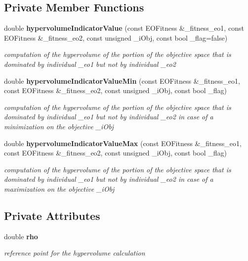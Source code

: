\subsection*{Private Member Functions}
\begin{CompactItemize}
\item 
double {\bf hypervolume\-Indicator\-Value} (const EOFitness \&\_\-fitness\_\-eo1, const EOFitness \&\_\-fitness\_\-eo2, const unsigned \_\-i\-Obj, const bool \_\-flag=false)
\begin{CompactList}\small\item\em computation of the hypervolume of the portion of the objective space that is dominated by individual \_\-eo1 but not by individual \_\-eo2 \item\end{CompactList}\item 
double {\bf hypervolume\-Indicator\-Value\-Min} (const EOFitness \&\_\-fitness\_\-eo1, const EOFitness \&\_\-fitness\_\-eo2, const unsigned \_\-i\-Obj, const bool \_\-flag)
\begin{CompactList}\small\item\em computation of the hypervolume of the portion of the objective space that is dominated by individual \_\-eo1 but not by individual \_\-eo2 in case of a minimization on the objective \_\-i\-Obj \item\end{CompactList}\item 
double {\bf hypervolume\-Indicator\-Value\-Max} (const EOFitness \&\_\-fitness\_\-eo1, const EOFitness \&\_\-fitness\_\-eo2, const unsigned \_\-i\-Obj, const bool \_\-flag)
\begin{CompactList}\small\item\em computation of the hypervolume of the portion of the objective space that is dominated by individual \_\-eo1 but not by individual \_\-eo2 in case of a maximization on the objective \_\-i\-Obj \item\end{CompactList}\end{CompactItemize}
\subsection*{Private Attributes}
\begin{CompactItemize}
\item 
double {\bf rho}\label{classeoBinaryHypervolumeIndicator_02fdfd1b2aa8071cdd3d395777d709a5}

\begin{CompactList}\small\item\em reference point for the hypervolume calculation \item\end{CompactList}\end{CompactItemize}


